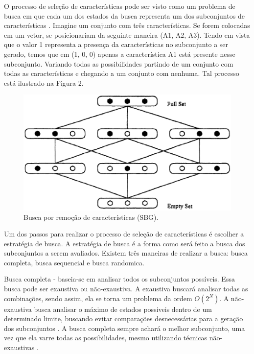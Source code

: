 O processo de seleção de características pode ser visto como um problema de busca em que cada um dos estados da busca representa um dos subconjuntos de características \cite{huan_1998}. Imagine um conjunto com três características. Se forem colocadas em um vetor, se posicionariam da seguinte maneira (A1, A2, A3). Tendo em vista que o valor 1 representa a presença da características no subconjunto a ser gerado, temos que em (1, 0, 0) apenas a característica A1 está presente nesse subconjunto. Variando todas as possibilidades partindo de um conjunto com todas as características e chegando a um conjunto com nenhuma. Tal processo está ilustrado na Figura 2.

\begin{figure}[h]
	\centering
	\label{fig03}
		\includegraphics[keepaspectratio=true,scale=0.6]{figuras/fig03.eps}
	\caption{Busca por remoção de características (SBG). \cite{huan_1998}}
\end{figure}

Um dos passos para realizar o processo de seleção de características é escolher a estratégia de busca. A estratégia de busca é a forma como será feito a busca dos subconjuntos a serem avaliados. Existem três maneiras de realizar a busca: busca completa, busca sequencial e busca randomica.

Busca completa - baseia-se em analisar todos os subconjuntos possíveis. Essa busca pode ser exaustiva ou não-exaustiva. A exaustiva buscará analisar todas as combinações, sendo assim, ela se torna um problema da ordem $O(2^N)$. A não-exaustiva busca analisar o máximo de estados possiveis dentro de um determinado limite, buscando evitar comparações desnecessárias para a geração dos subconjuntos \cite{liu_2005}. A busca completa sempre achará o melhor subconjunto, uma vez que ela varre todas as possibilidades, mesmo utilizando técnicas não-exaustivas \cite{dash_1997}.

